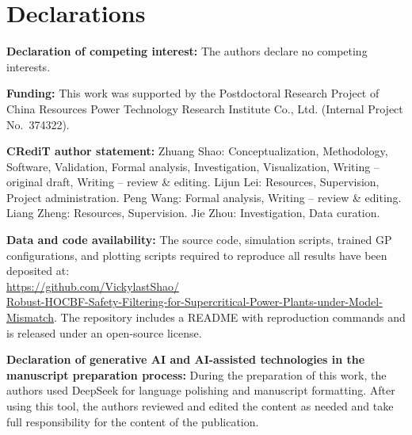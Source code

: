 \documentclass[final,5p,times,twocolumn]{elsarticle}
\begin{document}












\clearpage
\section*{Declarations}

\noindent\textbf{Declaration of competing interest:} The authors declare no competing interests.

\noindent\textbf{Funding:} This work was supported by the Postdoctoral Research Project of China Resources Power Technology Research Institute Co., Ltd. (Internal Project No.\ 374322).

\noindent\textbf{CRediT author statement:} Zhuang Shao: Conceptualization, Methodology, Software, Validation, Formal analysis, Investigation, Visualization, Writing -- original draft, Writing -- review \& editing. Lijun Lei: Resources, Supervision, Project administration. Peng Wang: Formal analysis, Writing -- review \& editing. Liang Zheng: Resources, Supervision. Jie Zhou: Investigation, Data curation.

\noindent\textbf{Data and code availability:} The source code, simulation scripts, trained GP configurations, and plotting scripts required to reproduce all results have been deposited at:\\ \url{https://github.com/VickylastShao/}\\\url{Robust-HOCBF-Safety-Filtering-for-Supercritical-Power-Plants-under-Model-Mismatch}. The repository includes a README with reproduction commands and is released under an open-source license.

\noindent\textbf{Declaration of generative AI and AI-assisted technologies in the manuscript preparation process:} During the preparation of this work, the authors used DeepSeek for language polishing and manuscript formatting. After using this tool, the authors reviewed and edited the content as needed and take full responsibility for the content of the publication.



\end{document}

